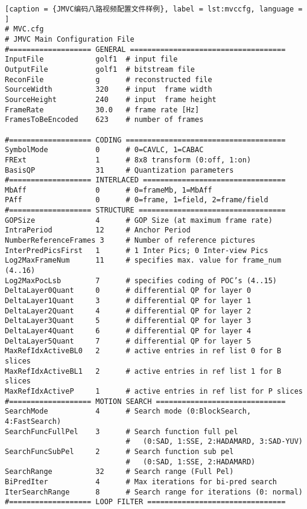 \begin{lstlisting}[caption = {JMVC编码八路视频配置文件样例}, label = lst:mvccfg, language = ]
# MVC.cfg
# JMVC Main Configuration File
#=================== GENERAL ====================================
InputFile            golf1  # input file
OutputFile           golf1  # bitstream file
ReconFile            g      # reconstructed file
SourceWidth          320    # input  frame width
SourceHeight         240    # input  frame height
FrameRate            30.0   # frame rate [Hz]
FramesToBeEncoded    623    # number of frames

#=================== CODING =====================================
SymbolMode           0      # 0=CAVLC, 1=CABAC
FRExt                1      # 8x8 transform (0:off, 1:on)
BasisQP              31     # Quantization parameters
#=================== INTERLACED =================================
MbAff                0      # 0=frameMb, 1=MbAff
PAff                 0      # 0=frame, 1=field, 2=frame/field
#=================== STRUCTURE ==================================
GOPSize              4      # GOP Size (at maximum frame rate) 
IntraPeriod          12     # Anchor Period
NumberReferenceFrames 3     # Number of reference pictures
InterPredPicsFirst   1      # 1 Inter Pics; 0 Inter-view Pics
Log2MaxFrameNum      11     # specifies max. value for frame_num (4..16)
Log2MaxPocLsb        7      # specifies coding of POC’s (4..15)
DeltaLayer0Quant     0      # differential QP for layer 0
DeltaLayer1Quant     3      # differential QP for layer 1
DeltaLayer2Quant     4      # differential QP for layer 2
DeltaLayer3Quant     5      # differential QP for layer 3
DeltaLayer4Quant     6      # differential QP for layer 4
DeltaLayer5Quant     7      # differential QP for layer 5
MaxRefIdxActiveBL0   2      # active entries in ref list 0 for B slices
MaxRefIdxActiveBL1   2      # active entries in ref list 1 for B slices
MaxRefIdxActiveP     1      # active entries in ref list for P slices
#=================== MOTION SEARCH ==============================
SearchMode           4      # Search mode (0:BlockSearch, 4:FastSearch)
SearchFuncFullPel    3      # Search function full pel
                            #   (0:SAD, 1:SSE, 2:HADAMARD, 3:SAD-YUV) 
SearchFuncSubPel     2      # Search function sub pel
                            #   (0:SAD, 1:SSE, 2:HADAMARD) 
SearchRange          32     # Search range (Full Pel)
BiPredIter           4      # Max iterations for bi-pred search
IterSearchRange      8      # Search range for iterations (0: normal)
#=================== LOOP FILTER ================================

\end{lstlisting}
